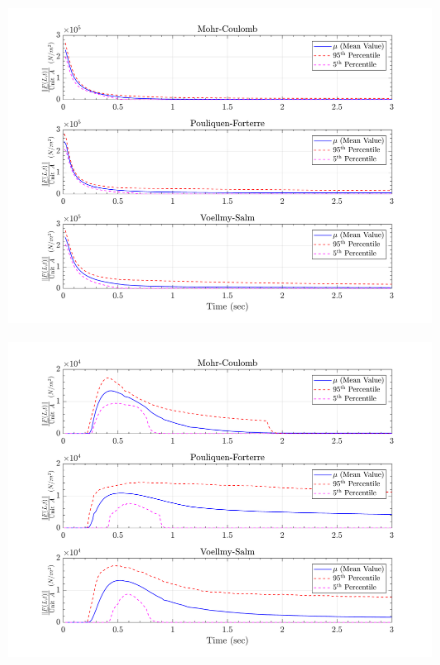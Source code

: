 \documentclass{article}
\begin{document}
\begin{figure}[H]
	\begin{minipage}[b]{0.5\linewidth}
    	\centering
    	\includegraphics[width=1\textwidth]{InclinedPlane/LocalRecords/Records/Fg_L1.png}
    	\label{fig:Ramp-L1-Fg}
	\end{minipage}
	\begin{minipage}[b]{0.5\linewidth}
		\centering
		\includegraphics[width=1\textwidth]{InclinedPlane/LocalRecords/Records/Fg_L8.png}
    	\label{fig:Ramp-L2-Fg}
    \end{minipage}
    

\end{figure}
\end{document}
